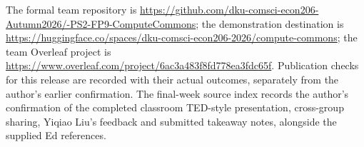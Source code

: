 The formal team repository is \url{https://github.com/dku-comsci-econ206-Autumn2026/-PS2-FP9-ComputeCommons}; the demonstration destination is \url{https://huggingface.co/spaces/dku-comsci-econ206-2026/compute-commons}; the team Overleaf project is \url{https://www.overleaf.com/project/6ac3a483f8fd778ea3fdc65f}. Publication checks for this release are recorded with their actual outcomes, separately from the author's earlier confirmation. The final-week source index records the author's confirmation of the completed classroom TED-style presentation, cross-group sharing, Yiqiao Liu's feedback and submitted takeaway notes, alongside the supplied Ed references.
